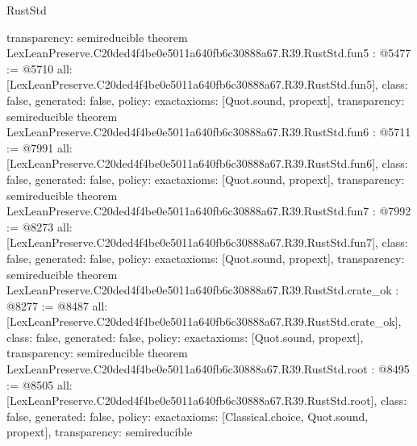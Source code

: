 \begin{lexlean}{RustStd}
\begin{coremodule}
{  transparency: semireducible
}
theorem LexLeanPreserve.C20ded4f4be0e5011a640fb6c30888a67.R39.RustStd.fun5 : @5477 := @5710 {
  all: [LexLeanPreserve.C20ded4f4be0e5011a640fb6c30888a67.R39.RustStd.fun5],
  class: false,
  generated: false,
  policy: exact{axioms: [Quot.sound, propext]},
  transparency: semireducible
}
theorem LexLeanPreserve.C20ded4f4be0e5011a640fb6c30888a67.R39.RustStd.fun6 : @5711 := @7991 {
  all: [LexLeanPreserve.C20ded4f4be0e5011a640fb6c30888a67.R39.RustStd.fun6],
  class: false,
  generated: false,
  policy: exact{axioms: [Quot.sound, propext]},
  transparency: semireducible
}
theorem LexLeanPreserve.C20ded4f4be0e5011a640fb6c30888a67.R39.RustStd.fun7 : @7992 := @8273 {
  all: [LexLeanPreserve.C20ded4f4be0e5011a640fb6c30888a67.R39.RustStd.fun7],
  class: false,
  generated: false,
  policy: exact{axioms: [Quot.sound, propext]},
  transparency: semireducible
}
theorem LexLeanPreserve.C20ded4f4be0e5011a640fb6c30888a67.R39.RustStd.crate_ok : @8277 := @8487 {
  all: [LexLeanPreserve.C20ded4f4be0e5011a640fb6c30888a67.R39.RustStd.crate_ok],
  class: false,
  generated: false,
  policy: exact{axioms: [Quot.sound, propext]},
  transparency: semireducible
}
theorem LexLeanPreserve.C20ded4f4be0e5011a640fb6c30888a67.R39.RustStd.root : @8495 := @8505 {
  all: [LexLeanPreserve.C20ded4f4be0e5011a640fb6c30888a67.R39.RustStd.root],
  class: false,
  generated: false,
  policy: exact{axioms: [Classical.choice, Quot.sound, propext]},
  transparency: semireducible
}


\end{coremodule}
\end{lexlean}
